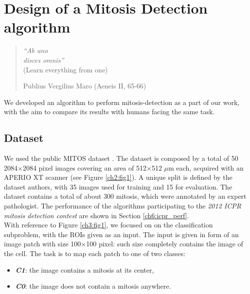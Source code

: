 \chapter{Design of a Mitosis Detection algorithm}
\label{chapter4}
\thispagestyle{empty}

\begin{quotation}
{\footnotesize
\noindent \emph{``Ab uno\\ disces omnis''}\\
\noindent (Learn everything from one)
\begin{flushright}
Publius Vergilius Maro (Aeneis II, 65-66)
\end{flushright}
}
\end{quotation}

\vspace{0.5cm}


We developed an algorithm to perform mitosis-detection as a part of our work, with the aim to compare its results with humans facing the same task.

\section{Dataset}

We used the public MITOS dataset \cite{icpr}. The dataset is composed by a total of 50 2084$\times$2084 pixel images
covering an area of 512$\times$512 $\mu$m each, acquired with an APERIO XT scanner (see Figure \ref{ch2:fig1}). 
A unique split is defined by the dataset authors, with 35 images used for training and 15 for evaluation.
The dataset contains a total of about 300 mitosis, which were annotated by an expert pathologist.
The performance of the algorithms participating to the \textit{2012 ICPR mitosis detection contest} are shown in Section \ref{ch6:icpr_perf}.\\
With reference to Figure \ref{ch3:fig1}, we focused on on the classification subproblem, with the \Glspl{ROI} given as an input.
The input is given in form of an image patch with size 100$\times$100 pixel: such size completely contains the image of the cell.
The task is to map each patch to one of two classes:
\begin{itemize}
 \item [] \textit{\textbf{C1}}: the image contains a mitosis at its center,
 \item [] \textit{\textbf{C0}}: the image does not contain a mitosis anywhere. 
\end{itemize}


